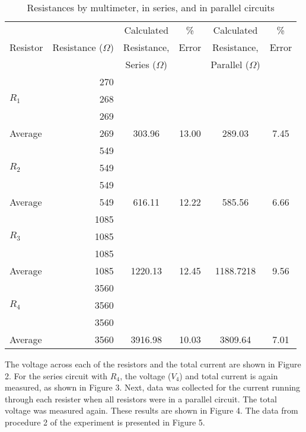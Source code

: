 \documentclass [12pt, letterpaper, twoside] {article}
\begin{document}
\begin{table}
  \centering
  \begin{tabular}{| l | r | c | c | c | c |}
    \hline\hline
    \multirow {3}{*}{Resistor} & & Calculated & \% & Calculated & \% \\
    & Resistance (\(\Omega\)) & Resistance, & Error & Resistance, & Error \\
    & & Series (\(\Omega\)) & & Parallel (\(\Omega\)) & \\
    \hline
    \multirow {3}{*}{\(R_{1}\)} & 270 & & & & \\
    & 268 & & & & \\
    & 269 & & & & \\
    \hline
    Average & 269 & 303.96 & 13.00 & 289.03 & 7.45 \\ %
    \hline
    \multirow {3}{*}{\(R_{2}\)} & 549 & & & & \\
    & 549 & & & & \\
    & 549 & & & & \\
    \hline
    Average & 549 & 616.11 & 12.22 & 585.56 & 6.66 \\ %
    \hline
    \multirow {3}{*}{\(R_{3}\)} & 1085 & & & & \\
    & 1085 & & & & \\
    & 1085 & & & & \\
    \hline
    Average & 1085 & 1220.13 & 12.45 & 1188.7218 & 9.56 \\ %
    \hline
    \multirow {3}{*}{\(R_{4}\)} & 3560 & & & & \\
    & 3560 & & & & \\
    & 3560 & & & & \\
    \hline
    Average & 3560 & 3916.98 & 10.03 & 3809.64 & 7.01 \\ %
    \hline\hline
  \end{tabular}
  \caption{Resistances by multimeter, in series, and in parallel circuits}
\end{table}

\noindent
The voltage across each of the resistors and the total current are shown in Figure 2. For the series circuit with \(R_{4}\), the voltage (\(V_{4}\)) and total current is again measured, as shown in Figure 3. Next, data was collected for the current running through each resister when all resistors were in a parallel circuit. The total voltage was measured again. These results are shown in Figure 4.
The data from procedure 2 of the experiment is presented in Figure 5.
\end{document}
